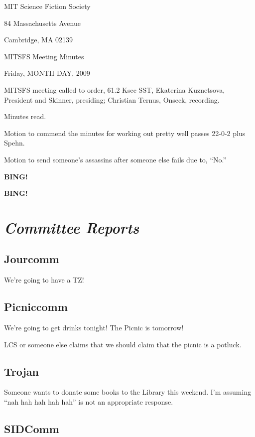\documentclass[10pt]{article}
\newcommand{\bing}{{\bf BING!} }
\newcommand{\goto}[1]{\bing \vskip 12pt \section*{{\em{#1}}}}
\newcommand{\ps}{ plus Spehn\xspace}
\begin{document}
\begin{center}

MIT Science Fiction Society

84 Massachusetts Avenue

Cambridge, MA 02139

\vspace{12pt}

MITSFS Meeting Minutes

Friday, MONTH DAY, 2009

\end{center}

\vspace{18pt}

\setlength{\parskip}{6pt}

\noindent
MITSFS meeting called to order, 61.2 Ksec SST,
Ekaterina Kuznetsova, President and Skinner, presiding; Christian Ternus, Onseck, recording.

Minutes read.

Motion to commend the minutes for working out pretty well passes 22-0-2\ps.

Motion to send someone's assassins after someone else fails due to, ``No.''

\bing

\goto{Committee Reports}

\subsection*{Jourcomm}

We're going to have a TZ!

\subsection*{Picniccomm}

We're going to get drinks tonight!  The Picnic is tomorrow!

LCS or someone else claims that we should claim that the picnic is a potluck.

\subsection*{Trojan}

Someone wants to donate some books to the Library this weekend.  I'm
assuming ``nah hah hah hah hah'' is not an appropriate response.

\subsection*{SIDComm}
\end{document}
